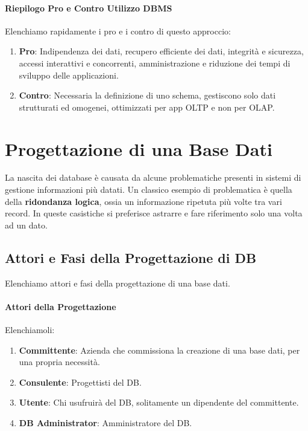 \documentclass{article}
\begin{document}
\paragraph{Riepilogo Pro e Contro Utilizzo DBMS}

Elenchiamo rapidamente i pro e i contro di questo approccio:

\begin{enumerate}
    \item \textbf{Pro}: Indipendenza dei dati, recupero efficiente dei dati, integrità e sicurezza, accessi interattivi e concorrenti, amministrazione e riduzione dei tempi di
    sviluppo delle applicazioni.
    \item \textbf{Contro}: Necessaria la definizione di uno schema, gestiscono solo dati strutturati ed omogenei, ottimizzati per app OLTP e non per OLAP.
\end{enumerate}

\newpage

\section{Progettazione di una Base Dati}

La nascita dei database è causata da alcune problematiche presenti in sistemi di
gestione informazioni più datati. Un classico esempio di problematica è quella della
\textbf{ridondanza logica}, ossia un informazione ripetuta più volte tra vari record. In queste
casistiche si preferisce astrarre e fare riferimento solo una volta ad un dato.

\subsection{Attori e Fasi della Progettazione di DB}

Elenchiamo attori e fasi della progettazione di una base dati.

\paragraph{Attori della Progettazione} Elenchiamoli:

\begin{enumerate}
    \item \textbf{Committente}: Azienda che commissiona la creazione di una base dati, per una propria necessità.
    \item \textbf{Consulente}: Progettisti del DB.
    \item \textbf{Utente}: Chi usufruirà del DB, solitamente un dipendente del committente.
    \item \textbf{DB Administrator}: Amministratore del DB.
\end{enumerate}
\end{document}
